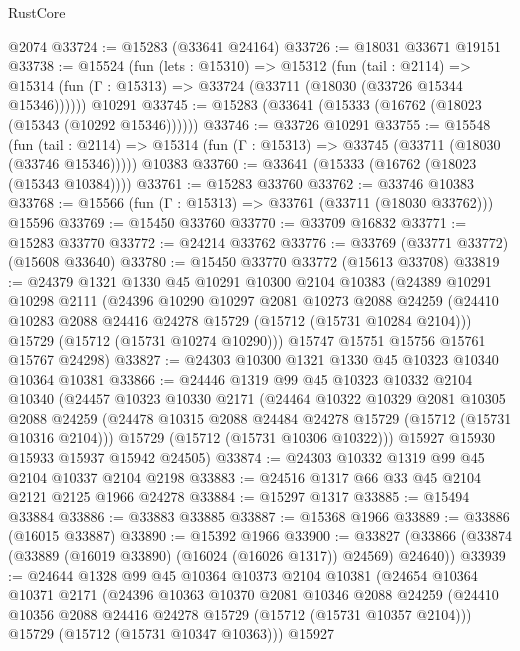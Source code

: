 \begin{lexlean}{RustCore}
\begin{coremodule}
    @2074
@33724 := @15283 (@33641 @24164)
@33726 := @18031 @33671 @19151
@33738 := @15524
    (fun (lets : @15310) =>
    @15312
      (fun (tail : @2114) =>
      @15314 (fun (Γ : @15313) => @33724 (@33711 (@18030 (@33726 @15344 @15346))))))
    @10291
@33745 := @15283 (@33641 (@15333 (@16762 (@18023 (@15343 (@10292 @15346))))))
@33746 := @33726 @10291
@33755 := @15548
    (fun (tail : @2114) => @15314 (fun (Γ : @15313) => @33745 (@33711 (@18030 (@33746 @15346)))))
    @10383
@33760 := @33641 (@15333 (@16762 (@18023 (@15343 @10384))))
@33761 := @15283 @33760
@33762 := @33746 @10383
@33768 := @15566 (fun (Γ : @15313) => @33761 (@33711 (@18030 @33762))) @15596
@33769 := @15450 @33760
@33770 := @33709 @16832
@33771 := @15283 @33770
@33772 := @24214 @33762
@33776 := @33769 (@33771 @33772) (@15608 @33640)
@33780 := @15450 @33770 @33772 (@15613 @33708)
@33819 := @24379
    @1321
    @1330
    @45
    @10291
    @10300
    @2104
    @10383
    (@24389
      @10291
      @10298
      @2111
      (@24396
        @10290
        @10297
        @2081
        @10273
        @2088
        @24259
        (@24410 @10283 @2088 @24416 @24278 @15729 (@15712 (@15731 @10284 @2104)))
        @15729
        (@15712 (@15731 @10274 @10290)))
      @15747
      @15751
      @15756
      @15761
      @15767
      @24298)
@33827 := @24303 @10300 @1321 @1330 @45 @10323 @10340 @10364 @10381
@33866 := @24446
    @1319
    @99
    @45
    @10323
    @10332
    @2104
    @10340
    (@24457
      @10323
      @10330
      @2171
      (@24464
        @10322
        @10329
        @2081
        @10305
        @2088
        @24259
        (@24478 @10315 @2088 @24484 @24278 @15729 (@15712 (@15731 @10316 @2104)))
        @15729
        (@15712 (@15731 @10306 @10322)))
      @15927
      @15930
      @15933
      @15937
      @15942
      @24505)
@33874 := @24303 @10332 @1319 @99 @45 @2104 @10337 @2104 @2198
@33883 := @24516 @1317 @66 @33 @45 @2104 @2121 @2125 @1966 @24278
@33884 := @15297 @1317
@33885 := @15494 @33884
@33886 := @33883 @33885
@33887 := @15368 @1966
@33889 := @33886 (@16015 @33887)
@33890 := @15392 @1966
@33900 := @33827 (@33866 (@33874 (@33889 (@16019 @33890) (@16024 (@16026 @1317)) @24569) @24640))
@33939 := @24644
    @1328
    @99
    @45
    @10364
    @10373
    @2104
    @10381
    (@24654
      @10364
      @10371
      @2171
      (@24396
        @10363
        @10370
        @2081
        @10346
        @2088
        @24259
        (@24410 @10356 @2088 @24416 @24278 @15729 (@15712 (@15731 @10357 @2104)))
        @15729
        (@15712 (@15731 @10347 @10363)))
      @15927

\end{coremodule}
\end{lexlean}
